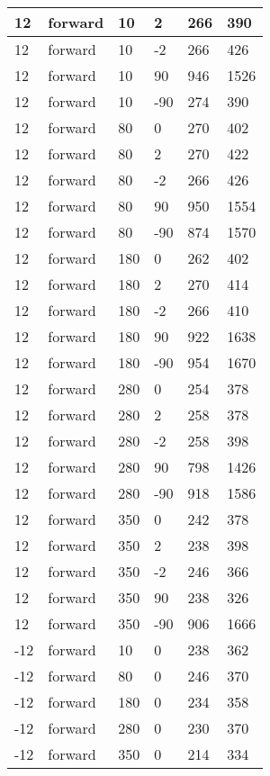 \begin{longtable}{|l|l|l|l|l|l|}
			12 & forward & 10 & 2 & 266 & 390 \\
			\hline
			12 & forward & 10 & -2 & 266 & 426 \\
			\hline
			12 & forward & 10 & 90 & 946 & 1526 \\
			\hline
			12 & forward & 10 & -90 & 274 & 390 \\
			\hline
			12 & forward & 80 & 0 & 270 & 402 \\
			\hline
			12 & forward & 80 & 2 & 270 & 422 \\
			\hline
			12 & forward & 80 & -2 & 266 & 426 \\
			\hline
			12 & forward & 80 & 90 & 950 & 1554 \\
			\hline
			12 & forward & 80 & -90 & 874 & 1570 \\
			\hline
			12 & forward & 180 & 0 & 262 & 402 \\
			\hline
			12 & forward & 180 & 2 & 270 & 414 \\
			\hline
			12 & forward & 180 & -2 & 266 & 410 \\
			\hline
			12 & forward & 180 & 90 & 922 & 1638 \\
			\hline
			12 & forward & 180 & -90 & 954 & 1670 \\
			\hline
			12 & forward & 280 & 0 & 254 & 378 \\
			\hline
			12 & forward & 280 & 2 & 258 & 378 \\
			\hline
			12 & forward & 280 & -2 & 258 & 398 \\
			\hline
			12 & forward & 280 & 90 & 798 & 1426 \\
			\hline
			12 & forward & 280 & -90 & 918 & 1586 \\
			\hline
			12 & forward & 350 & 0 & 242 & 378 \\
			\hline
			12 & forward & 350 & 2 & 238 & 398 \\
			\hline
			12 & forward & 350 & -2 & 246 & 366 \\
			\hline
			12 & forward & 350 & 90 & 238 & 326 \\
			\hline
			12 & forward & 350 & -90 & 906 & 1666 \\
			\hline
			-12 & forward & 10 & 0 & 238 & 362 \\
			\hline
			-12 & forward & 80 & 0 & 246 & 370 \\
			\hline
			-12 & forward & 180 & 0 & 234 & 358 \\
			\hline
			-12 & forward & 280 & 0 & 230 & 370 \\
			\hline
			-12 & forward & 350 & 0 & 214 & 334 \\

\end{longtable}
